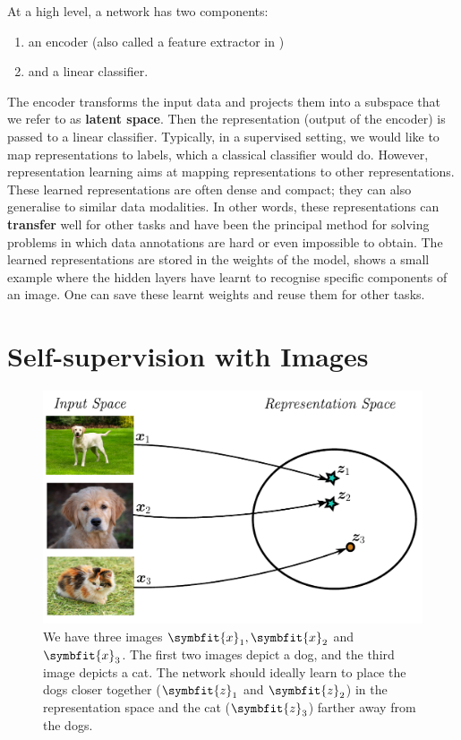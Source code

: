 At a high level, a network has two components:
\begin{enumerate}
    \item an encoder (also called a feature extractor in )
    \item and a linear classifier.
\end{enumerate}
The encoder transforms the input data and projects them into a subspace that we refer to as \textbf{latent space}. Then the representation (output of the encoder) is passed to a linear classifier. Typically, in a supervised setting, we would like to map representations to labels, which a classical classifier would do. 
However, representation learning aims at mapping representations to other representations. These learned representations are often dense and compact; they can also generalise to similar data modalities. In other words, these representations can \textbf{transfer} well for other tasks and have been the principal method for solving problems in which data annotations are hard or even impossible to obtain. The learned representations are stored in the weights of the model,  shows a small example where the hidden layers have learnt to recognise specific components of an image. One can save these learnt weights and reuse them for other tasks. 

\section{Self-supervision with Images} \label{sec:self-sup-with-images}

\begin{figure}
    \centering
    \includegraphics[scale=0.4]{chapters/assets/ssl_figs/representation_space.pdf}
    \caption{We have three images $\symbfit{x}_1, \symbfit{x}_2$ and $\symbfit{x}_3$. The first two images depict a dog, and the third image depicts a cat. The network should ideally learn to place the dogs closer together ($\symbfit{z}_1$ and $\symbfit{z}_2$) in the representation space and the cat ($\symbfit{z}_3$) farther away from the dogs.}
    \label{fig:my_label}
\end{figure}

